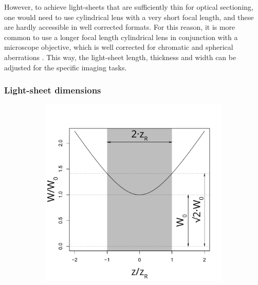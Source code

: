     However, to achieve light-sheets that are sufficiently thin for optical sectioning, one would need to use cylindrical lens with a very short focal length, and these are hardly accessible in well corrected formats. For this reason, it is more common to use a longer focal length cylindrical lens in conjunction with a microscope objective, which is well corrected for chromatic and spherical aberrations \cite{greger_basic_2007}. This way, the light-sheet length, thickness and width can be adjusted for the specific imaging tasks.


    \subsubsection{Light-sheet dimensions}
    \label{sec:dimensions}
    \begin{figure}
      \centering
      \begin{subfigure}[b]{0.29\textwidth}
          \centering
          \includegraphics[width=\textwidth]{width}
          \caption{}
          \label{fig:width}
      \end{subfigure}
      \begin{subfigure}[b]{0.29\textwidth}
          \centering

\end{subfigure}
\end{figure}
